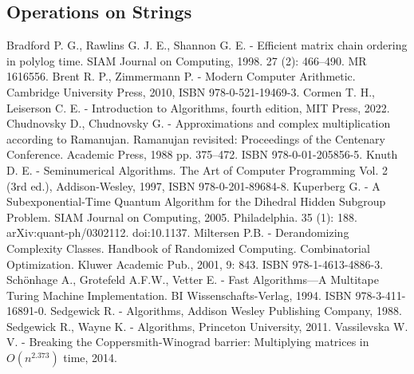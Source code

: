 \documentclass{article}
\begin{document}

\newpage
\subsection*{Operations on Strings}



\newpage
{}

\begin{thebibliography}{10}
	 Bradford P. G., Rawlins G. J. E., Shannon G. E. - Efficient matrix chain ordering in polylog time. SIAM Journal on Computing, 1998. 27 (2): 466–490. MR 1616556.
	 Brent R. P., Zimmermann P. - Modern Computer Arithmetic. Cambridge University Press, 2010, ISBN 978-0-521-19469-3.
	 Cormen T. H., Leiserson C. E. - Introduction to Algorithms, fourth edition, MIT Press, 2022.
	 Chudnovsky D., Chudnovsky G. - Approximations and complex multiplication according to Ramanujan. Ramanujan revisited: Proceedings of the Centenary Conference. Academic Press, 1988 pp. 375–472. ISBN 978-0-01-205856-5.
	 Knuth D. E. - Seminumerical Algorithms. The Art of Computer Programming Vol. 2 (3rd ed.), Addison-Wesley, 1997, ISBN 978-0-201-89684-8.
	 Kuperberg G. - A Subexponential-Time Quantum Algorithm for the Dihedral Hidden Subgroup Problem. SIAM Journal on Computing, 2005. Philadelphia. 35 (1): 188. arXiv:quant-ph/0302112. doi:10.1137.
	 Miltersen P.B.  - Derandomizing Complexity Classes. Handbook of Randomized Computing. Combinatorial Optimization. Kluwer Academic Pub., 2001,  9: 843. ISBN 978-1-4613-4886-3.
	 Schönhage A., Grotefeld A.F.W., Vetter E. - Fast Algorithms—A Multitape Turing Machine Implementation. BI Wissenschafts-Verlag, 1994. ISBN 978-3-411-16891-0.
	 Sedgewick R. - Algorithms, Addison Wesley Publishing Company, 1988.
	 Sedgewick R., Wayne K. - Algorithms, Princeton University, 2011.
	 Vassilevska W. V. - Breaking the Coppersmith-Winograd barrier: Multiplying matrices in $O(n^{2.373})$ time, 2014.
\end{thebibliography}
\end{document}
